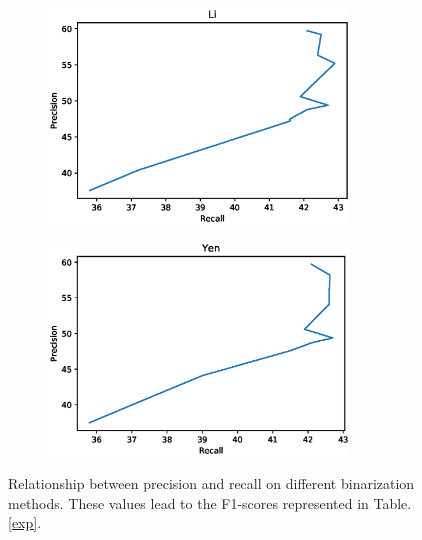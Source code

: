 \documentclass[11pt]{article}
\begin{document}
\begin{figure}[H]
\begin{subfigure}{7cm}
		\caption{}
	\end{subfigure}
	\begin{subfigure}{7cm}
		\centering\includegraphics[width=8cm]{files/results/li_roc.eps}
		\caption{}
	\end{subfigure}
	\begin{subfigure}[b]{1.0\textwidth}
		\centering
		\includegraphics[width=8cm]{files/results/yen_roc.eps}
		\caption{}
	\end{subfigure}

	\caption{Relationship between precision and recall on different binarization methods. These values lead to the F1-scores represented in Table. \ref{exp}.}
	\label{thresh_methods}
\end{figure}

%
%
\end{document}
